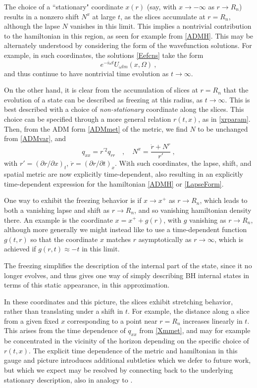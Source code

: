 \documentclass[11pt]{article}
\numberwithin{equation}{section}
\newcommand{\beq}{\begin{equation}}
\newcommand{\eeq}{\end{equation}}
\begin{document}
The choice of a ``stationary" coordinate $x(r)$ (say, with $x\rightarrow -\infty$ as $r\rightarrow R_n$) results in a nonzero shift $N^x$ at large $t$, as the slices accumulate at $r=R_n$, although the lapse $N$ vanishes in this limit.  This implies a nontrivial contribution to the hamiltonian in this region, as seen for example from \eqref{ADMH}.  This may be alternately understood by considering the form of the wavefunction solutions.  For example, in such coordinates, the solutions \eqref{Eefcns} take the form 
\beq
e^{-i\omega t} U_{\omega lm}(x,\Omega)\ ,
\eeq
and thus continue to have nontrivial time evolution as $t\rightarrow\infty$.

On the other hand, it is clear from the accumulation of slices at $r=R_n$ that the evolution of a state can be described as freezing\cite{QBHB}\cite{BHQIUE} at this radius, as $t\rightarrow \infty$.  This is best described with a choice of {\it non-stationary} coordinate along the slices.  This choice can be specified through a more general relation $r(t,x)$, as in \eqref{xrparam}.  Then, from the ADM form \eqref{ADMmet} of the metric, we find $N$ to be unchanged from \eqref{ADMvar}, and
\beq\label{Xmmet}
q_{xx}=r^{\prime 2} q_{rr}\quad ,\quad N^x = \frac{\dot r + N^r}{r'}\ ,
\eeq
with $r'=(\partial r/\partial x)_t$, $\dot r= (\partial r/\partial t)_x$.  With such coordinates, the lapse, shift, and spatial metric are now explicitly time-dependent, also resulting in an explicitly time-dependent expression for the hamiltonian \eqref{ADMH} or \eqref{LapseForm}.  

One way to exhibit the freezing behavior is if $x\rightarrow x^+$ as $r\rightarrow R_n$, which leads to both a vanishing lapse and shift as $r\rightarrow R_n$, and so vanishing hamiltonian density there.  An example\cite{SE2d} is the coordinate $x=x^+ + g(r)$, with $g$ vanishing as $r\rightarrow R_n$, although more generally we might  instead like to use a time-dependent function $g(t,r)$ so that the coordinate $x$ matches $r$ asymptotically as $r\rightarrow\infty$, which is achieved if $g(r,t)\approx -t$ in this limit.  

The freezing simplifies the description of the internal part of the state, since it no longer evolves, and thus gives one way of simply describing BH internal states in terms of this static appearance, in this approximation.  

In these coordinates and this picture, the slices exhibit stretching behavior, rather than translating under a shift in $t$.  For example, the distance along a slice from a given fixed $x$ corresponding to a point near $r=R_n$ increases linearly in $t$.  This arises from the time dependence of $q_{xx}$ from \eqref{Xmmet}, and may for example be concentrated in the vicinity of the horizon depending on the specific choice of $r(t,x)$.  
 The explicit time dependence of the metric and hamiltonian in this gauge  and picture introduces additional subtleties which we defer to future work, but which we expect may be resolved by connecting back to the underlying stationary description, also in analogy to \cite{MuOe}.  
\end{document}

